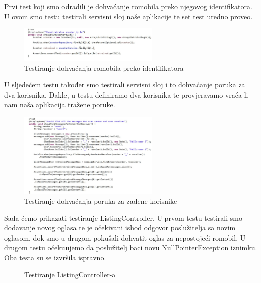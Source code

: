			Prvi test koji smo odradili je dohvaćanje romobila preko njegovog identifikatora. U ovom smo testu testirali servisni sloj naše aplikacije te set test uredno proveo.
			\begin{figure}[h]
				\centering
				\includegraphics[width=0.6\textwidth]{slike/scooter_service_test.jpg}
				\caption{Testiranje dohvaćanja romobila preko identifikatora}
				\label{fig:Testiranje dohvaćanja romobila preko identifikatora}
			\end{figure}
			
			U sljedećem testu također smo testirali servisni sloj i to dohvaćanje poruka za dva korisnika. Dakle, u testu definiramo dva korisnika te provjeravamo vraća li nam naša aplikacija tražene poruke.
			\begin{figure}[h]
				\centering
				\includegraphics[width=0.6\textwidth]{slike/message_service_test.jpg}
				\caption{Testiranje dohvaćanja poruka za zadene korisnike}
				\label{fig:Testiranje dohvaćanja poruka za zadene korisnike}
			\end{figure}
			
			Sada ćemo prikazati testiranje ListingController. U prvom testu testirali smo dodavanje novog oglasa te je očekivani ishod odgovor poslužitelja sa novim oglasom, dok smo u drugom pokušali dohvatit oglas za nepostojeći romobil. U drugom testu očekuujemo da poslužitelj baci novu NullPointerException iznimku. Oba testa su se izvršila ispravno. \newline
			
			  \begin{figure}
					  	\centering
					  	\caption{Testiranje ListingController-a}
					  	\label{fig:Testiranje ListingController-a}
			  \end{figure}
			  
